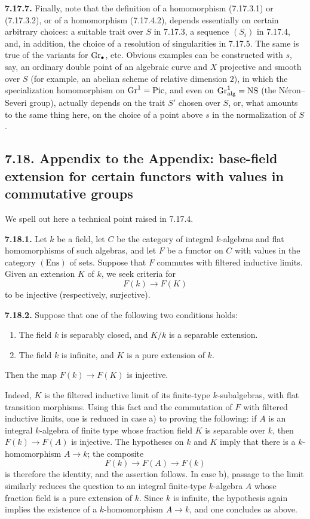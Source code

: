 \textbf{7.17.7.}
Finally, note that the definition of a homomorphism (7.17.3.1) or
(7.17.3.2), or of a homomorphism (7.17.4.2), depends essentially on certain
arbitrary choices: a suitable trait over $S$ in 7.17.3, a sequence $(S_i)$
in 7.17.4, and, in addition, the choice of a resolution of singularities in
7.17.5. The same is true of the variants for $\operatorname{Gr}_\bullet$, etc. Obvious
examples can be constructed with $s$, say, an ordinary double point of an
algebraic curve and $X$ projective and smooth over $S$ (for example, an
abelian scheme of relative dimension $2$), in which the specialization
homomorphism on $\operatorname{Gr}^1=\operatorname{Pic}$, and even on
$\operatorname{Gr}^1_{\mathrm{alg}}=\mathrm{NS}$ (the Néron--Severi group), actually
depends on the trait $S'$ chosen over $S$, or, what amounts to the same thing
here, on the choice of a point above $s$ in the normalization of $S$.

\subsection*{7.18. Appendix to the Appendix: base-field extension for certain
functors with values in commutative groups}
We spell out here a technical point raised in 7.17.4.

\textbf{7.18.1.}
Let $k$ be a field, let $C$ be the category of integral $k$-algebras and
flat homomorphisms of such algebras, and let $F$ be a functor on $C$ with
values in the category $(\mathrm{Ens})$ of sets. Suppose that $F$ commutes
with filtered inductive limits. Given an extension $K$ of $k$, we seek
criteria
for
\[
F(k)\longrightarrow F(K)
\]
to be injective (respectively, surjective).

\textbf{7.18.2.}
Suppose that one of the following two conditions holds:
\begin{enumerate}[label=\alph*)]
\item The field $k$ is separably closed, and $K/k$ is a separable extension.
\item The field $k$ is infinite, and $K$ is a pure extension of $k$.
\end{enumerate}
Then the map $F(k)\to F(K)$ is injective.

Indeed, $K$ is the filtered inductive limit of its finite-type
$k$-subalgebras, with flat transition morphisms. Using this fact and the
commutation of $F$ with filtered inductive limits, one is reduced in case
a) to proving the following: if $A$ is an integral $k$-algebra of finite
type whose fraction field $K$ is separable over $k$, then
$F(k)\to F(A)$ is injective. The hypotheses on $k$ and $K$ imply that there
is a $k$-homomorphism $A\to k$; the composite
\[
F(k)\longrightarrow F(A)\longrightarrow F(k)
\]
is therefore the identity, and the assertion follows. In case b), passage
to the limit similarly reduces the question to an integral finite-type
$k$-algebra $A$ whose fraction field is a pure extension of $k$. Since $k$
is infinite, the hypothesis again implies the existence of a
$k$-homomorphism $A\to k$, and one concludes as above.

